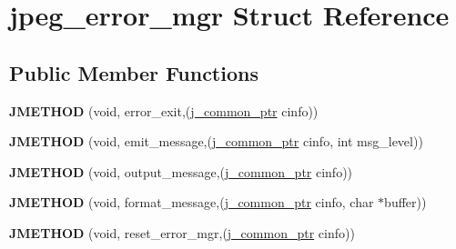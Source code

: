 \hypertarget{structjpeg__error__mgr}{}\section{jpeg\+\_\+error\+\_\+mgr Struct Reference}
\label{structjpeg__error__mgr}
\subsection*{Public Member Functions}
\begin{DoxyCompactItemize}
\item 
{\bfseries J\+M\+E\+T\+H\+OD} (void, error\+\_\+exit,(\hyperlink{structjpeg__common__struct}{j\+\_\+common\+\_\+ptr} cinfo))\hypertarget{structjpeg__error__mgr_ad6c1713c54424636208abbade52874e4}{}\label{structjpeg__error__mgr_ad6c1713c54424636208abbade52874e4}

\item 
{\bfseries J\+M\+E\+T\+H\+OD} (void, emit\+\_\+message,(\hyperlink{structjpeg__common__struct}{j\+\_\+common\+\_\+ptr} cinfo, int msg\+\_\+level))\hypertarget{structjpeg__error__mgr_a73c0a027b6e6cb8ff2b7b0fc42f756f9}{}\label{structjpeg__error__mgr_a73c0a027b6e6cb8ff2b7b0fc42f756f9}

\item 
{\bfseries J\+M\+E\+T\+H\+OD} (void, output\+\_\+message,(\hyperlink{structjpeg__common__struct}{j\+\_\+common\+\_\+ptr} cinfo))\hypertarget{structjpeg__error__mgr_ac2989f8ef34acdd78ce26a9110a1c094}{}\label{structjpeg__error__mgr_ac2989f8ef34acdd78ce26a9110a1c094}

\item 
{\bfseries J\+M\+E\+T\+H\+OD} (void, format\+\_\+message,(\hyperlink{structjpeg__common__struct}{j\+\_\+common\+\_\+ptr} cinfo, char $\ast$buffer))\hypertarget{structjpeg__error__mgr_a5f1dfb51c337c36ae1bc5fae7f84528f}{}\label{structjpeg__error__mgr_a5f1dfb51c337c36ae1bc5fae7f84528f}

\item 
{\bfseries J\+M\+E\+T\+H\+OD} (void, reset\+\_\+error\+\_\+mgr,(\hyperlink{structjpeg__common__struct}{j\+\_\+common\+\_\+ptr} cinfo))\hypertarget{structjpeg__error__mgr_ac676478083167b3731995d7901bd4b6c}{}\label{structjpeg__error__mgr_ac676478083167b3731995d7901bd4b6c}

\end{DoxyCompactItemize}
